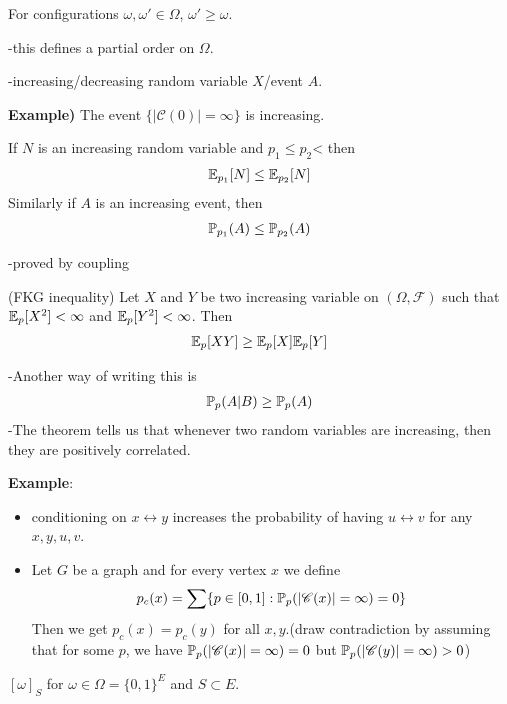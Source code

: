 \documentclass[10pt,a4paper]{report}
\begin{document}
 For configurations $\omega, \omega' \in \Omega$, $\omega' \geq \omega$.

-this defines a partial order on $\Omega$.

-increasing/decreasing random variable $X$/event $A$.
\s

\textbf{Example)} The event $\{ |\mathscr{C(0)}| = \infty  \}$ is increasing.
\s

 If $N$ is an increasing random variable and $p_1\leq p_2$< then
\begin{align*}
\mathbb{E}_{p_1}[N] \leq \mathbb{E}_{p_2}[N]
\end{align*}
Similarly if $A$ is an increasing event, then\\
\begin{align*}
\mathbb{P}_{p_1}(A) \leq \mathbb{P}_{p_2}(A)
\end{align*}

-proved by coupling
\s

(FKG inequality) Let $X$ and $Y$ be two increasing variable on $(\Omega, \mathscr{F})$ such that $\mathbb{E}_p[X^2]<\infty$ and $\mathbb{E}_p[Y^2]<\infty$. Then
\begin{align*}
\mathbb{E}_{p}[XY] \geq \mathbb{E}_p [X] \mathbb{E}_p [Y]
\end{align*}

-Another way of writing this is
\begin{align*}
\mathbb{P}_p(A|B) \geq \mathbb{P}_p(A)
\end{align*}
-The theorem tells us that whenever two random variables are increasing, then they are positively correlated.
\s

\textbf{Example}:
\begin{itemize}
\item conditioning on $x\leftrightarrow y$ increases the probability of having $u\leftrightarrow v$ for any $x,y,u,v$. 

\item Let $G$ be a graph and for every vertex $x$ we define
\begin{align*}
p_c(x) = \sum \{p\in[0,1] : \mathbb{P}_p (|\mathscr{C}(x)|=\infty )=0 \}
\end{align*}
Then we get $p_c(x) =p_c(y)$ for all $x,y$.(draw contradiction by assuming that for some $p$, we have $\mathbb{P}_p (|\mathscr{C}(x)|=\infty )=0$ but $\mathbb{P}_p (|\mathscr{C}(y)|=\infty )>0$)
\end{itemize} 
\s

 $[\omega]_S$ for $\omega \in \Omega = \{0,1\}^E$ and $S\subset E$.
\end{document}
